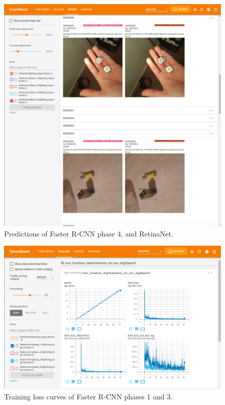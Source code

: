 \documentclass{article}
\begin{document}
\begin{figure}[h]
    \centering
    \includegraphics[width=\textwidth]{tensorboard_screenshots/predictions.png}
    \caption{Predictions of Faster R-CNN phase 4, and RetinaNet.}
    \label{fig:predictions}
\end{figure}

\begin{figure}[h]
    \centering
    \includegraphics[width=\textwidth]{tensorboard_screenshots/train_losses_p13.png}
    \caption{Training loss curves of Faster R-CNN phases 1 and 3.}
    \label{fig:train_losses_p13}
\end{figure}
\end{document}

